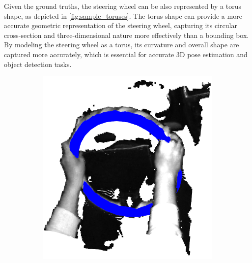 Given the ground truths, the steering wheel can be also represented 
by a torus shape, as depicted in \cref{fig:sample_toruses}. 
The torus shape can provide a more accurate geometric 
representation of the steering wheel, capturing its circular 
cross-section and three-dimensional nature more effectively 
than a bounding box. By modeling the steering wheel as a 
torus, its curvature and overall shape are captured more accurately, which is essential for accurate 3D pose estimation and 
object detection tasks.


\begin{figure}[ht]
    \centering
    \begin{subfigure}[t]{0.3\textwidth}
        \centering
        \includegraphics[width=\textwidth]{media/chapter 3/torus1.png}
    \end{subfigure}\hfill
    \begin{subfigure}[t]{0.3\textwidth}
        \centering

\end{subfigure}
\end{figure}
